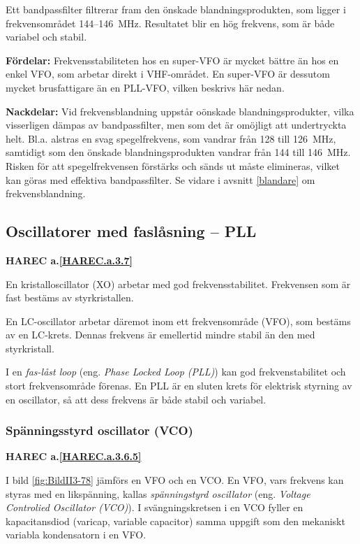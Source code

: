Ett bandpassfilter filtrerar fram den önskade blandningsprodukten, som
ligger i frekvensområdet 144--146~MHz.
Resultatet blir en hög frekvens, som är både variabel och stabil.

\textbf{Fördelar:}
Frekvensstabiliteten hos en super-VFO är mycket bättre än hos en enkel VFO,
som arbetar direkt i VHF-området.
En super-VFO är dessutom mycket brusfattigare än en PLL-VFO, vilken
beskrivs här nedan.

\textbf{Nackdelar:}
Vid frekvensblandning uppstår oönskade blandningsprodukter, vilka visserligen
dämpas av bandpassfilter, men som det är omöjligt att undertryckta helt.
Bl.a. alstras en svag spegelfrekvens, som vandrar från 128 till 126~MHz,
samtidigt som den önskade blandningsprodukten vandrar från 144 till 146~MHz.
Risken för att spegelfrekvensen förstärks och sänds ut måste elimineras,
vilket kan göras med effektiva bandpassfilter.
Se vidare i avsnitt \ref{blandare} om frekvensblandning.

\subsection{Oscillatorer med faslåsning -- PLL}
\textbf{HAREC
  a.\ref{HAREC.a.3.7}\label{myHAREC.a.3.7}
}

En kristalloscillator (XO) arbetar med god frekvensstabilitet.
Frekvensen som är fast bestäms av styrkristallen.

En LC-oscillator arbetar däremot inom ett frekvensområde (VFO), som
bestäms av en LC-krets.
Dennas frekvens är emellertid mindre stabil än den med styrkristall.

I en \emph{fas-låst loop} (eng. \emph{Phase Locked Loop (PLL)}) kan god
frekvenstabilitet och stort frekvensområde förenas.
En PLL är en sluten krets för elektrisk styrning av en oscillator, så att dess
frekvens är både stabil och variabel.

\subsubsection{Spänningsstyrd oscillator (VCO)}
\textbf{HAREC a.\ref{HAREC.a.3.6.5}\label{myHAREC.a.3.6.5}}

I bild \ref{fig:BildII3-78} jämförs en VFO och en VCO.
En VFO, vars frekvens kan styras med en likspänning, kallas
\emph{spänningstyrd oscillator} (eng. \emph{Voltage Controlied Oscillator
  (VCO)}).
I svängningskretsen i en VCO fyller en kapacitansdiod (varicap, variable
capacitor) samma uppgift som den mekaniskt variabla kondensatorn i en VFO.

